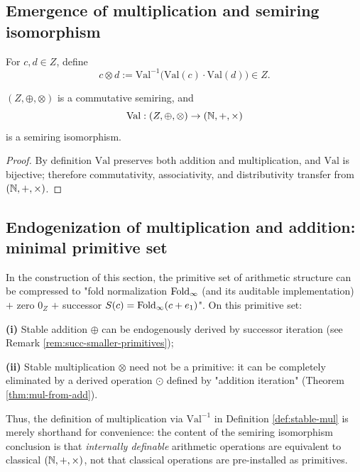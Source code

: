 \subsection{Emergence of multiplication and semiring isomorphism}
\begin{definition}\label{def:stable-mul}
For $c,d\in Z$, define
$$
c\otimes d := \mathrm{Val}^{-1}\bigl(\mathrm{Val}(c)\cdot \mathrm{Val}(d)\bigr)\in Z.
$$
\end{definition}

\begin{theorem}\label{thm:mul-isom}
$(Z,\oplus,\otimes)$ is a commutative semiring, and
$$
\mathrm{Val}:(Z,\oplus,\otimes)\to (\mathbb{N},+,\times)
$$
is a semiring isomorphism.\par
\end{theorem}

\begin{proof}
By definition $\mathrm{Val}$ preserves both addition and multiplication, and $\mathrm{Val}$ is bijective; therefore commutativity, associativity, and distributivity transfer from $(\mathbb{N},+,\times)$.\par
\end{proof}

\subsection{Endogenization of multiplication and addition: minimal primitive set}
\begin{proposition}\label{prop:definitional-economy-arith}
In the construction of this section, the primitive set of arithmetic structure can be compressed to "fold normalization $\mathrm{Fold}_\infty$ (and its auditable implementation) $+$ zero $0_Z$ $+$ successor $S(c)=\mathrm{Fold}_\infty(c+e_1)$". On this primitive set:\par
\noindent\textbf{(i)} Stable addition $\oplus$ can be endogenously derived by successor iteration (see Remark \ref{rem:succ-smaller-primitives});\par
\noindent\textbf{(ii)} Stable multiplication $\otimes$ need not be a primitive: it can be completely eliminated by a derived operation $\odot$ defined by "addition iteration" (Theorem \ref{thm:mul-from-add}).\par
Thus, the definition of multiplication via $\mathrm{Val}^{-1}$ in Definition \ref{def:stable-mul} is merely shorthand for convenience: the content of the semiring isomorphism conclusion is that \emph{internally definable} arithmetic operations are equivalent to classical $(\mathbb{N},+,\times)$, not that classical operations are pre-installed as primitives.\par
\end{proposition}

